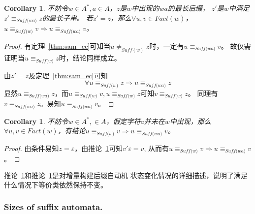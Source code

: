 \documentclass[UTF8]{ctexart}
\newtheorem{cor}[thm]{Corollary}
\theoremstyle{definition}
\theoremstyle{remark}
\numberwithin{equation}{subsection}
\newcommand{\equsuf}[1][x]{\equiv_{\textit{Suff(#1)}}}
\newcommand{\Suff}{\textit{Suff}}
\begin{document}
	\begin{cor}
	\label{cor:z_u_equsuf_v}
		不妨令$w \in A^*, a \in A$，$z$是$w$中出现的$wa$的最长后缀，
		$z'$是$w$中满足$z' \equsuf[wa] z$的最长子串。
		若$z' = z$，那么$\forall u,v \in Fact(w)$，
		$u \equsuf[w] v \Longrightarrow u \equsuf[wa] v$。
	\end{cor}
	\begin{proof}
		有定理~\ref{thm:sam_ec}可知当$u \neq_{\Suff(w)} z$时，一定有$u \equsuf[wa] v$。
		故仅需证明当$u \equsuf[w] z$时，结论同样成立。
		
		由$z' = z$及定理~\ref{thm:sam_ec}可知
		\[
			\forall u \equsuf[w] z \Rightarrow u \equsuf[wa] z
		\]
		显然$u \equsuf[wa] z$，而$u \equsuf[w] v, u \equsuf[w] z$可知$v \equsuf[w] z$。
		同理有$v \equsuf[wa] z$。易知$u \equsuf[wa] v$。
	\end{proof}
	
	\begin{cor}
	\label{cor:a_notin_w}
		不妨令$w \in A^*, \in A$，假定字符$a$并未在$w$中出现，那么
		$\forall u,v \in Fact(w)$，有结论$u \equsuf[w] v \Longrightarrow u \equsuf[wa] v$。
	\end{cor}
	\begin{proof}
		由条件易知$z = \varepsilon$，由推论~\ref{cor:z_u_equsuf_v}可知$v' \varepsilon = v$,
		从而有$u \equsuf[w] v \Longrightarrow u \equsuf[wa] v$。
	\end{proof}
	
	推论~\ref{cor:z_u_equsuf_v}和推论~\ref{cor:a_notin_w}是对增量构建后缀自动机
	状态变化情况的详细描述，说明了满足什么情况下等价类依然保持不变。
	
\subsubsection{Sizes of suffix automata.}
	
	
	
\end{document}
